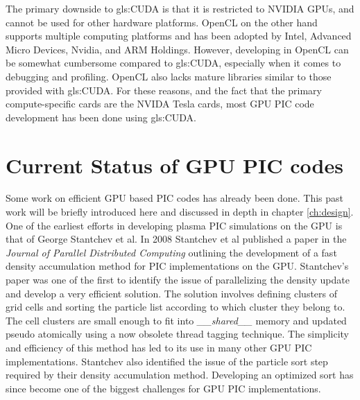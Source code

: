 The primary downside to \gls{gls:CUDA} is that it is restricted to NVIDIA GPUs, and cannot be used for other hardware platforms. OpenCL on the other hand supports multiple computing platforms and has been adopted by Intel, Advanced Micro Devices, Nvidia, and ARM Holdings. However, developing in OpenCL can be somewhat cumbersome compared to \gls{gls:CUDA}, especially when it comes to debugging and profiling. OpenCL also lacks mature libraries similar to those provided with \gls{gls:CUDA}. For these reasons, and the fact that the primary compute-specific cards are the NVIDA Tesla cards, most GPU PIC code development has been done using \gls{gls:CUDA}.\cite{NVIDIACorporation2012d,NVIDIACorporation2011}

		\section{Current Status of GPU PIC codes}

						Some work on efficient GPU based PIC codes has already been done. This past work will be briefly introduced here and discussed in depth in chapter \ref{ch:design}. One of the earliest efforts in developing plasma PIC simulations on the GPU is that of George Stantchev et al. In 2008 Stantchev et al published a paper in the \emph{Journal of Parallel Distributed Computing}\cite{Stantchev2008} outlining the development of a fast density accumulation method for PIC implementations on the GPU. Stantchev's paper was one of the first to identify the issue of parallelizing the density update and develop a very efficient solution. The solution involves defining clusters of grid cells and sorting the particle list according to which cluster they belong to. The cell clusters are small enough to fit into \emph{\_\_shared\_\_} memory and updated pseudo atomically using a now obsolete thread tagging technique. The simplicity and efficiency of this method has led to its use in many other GPU PIC implementations. Stantchev also identified the issue of the particle sort step required by their density accumulation method. Developing an optimized sort has since become one of the biggest challenges for GPU PIC implementations. 

